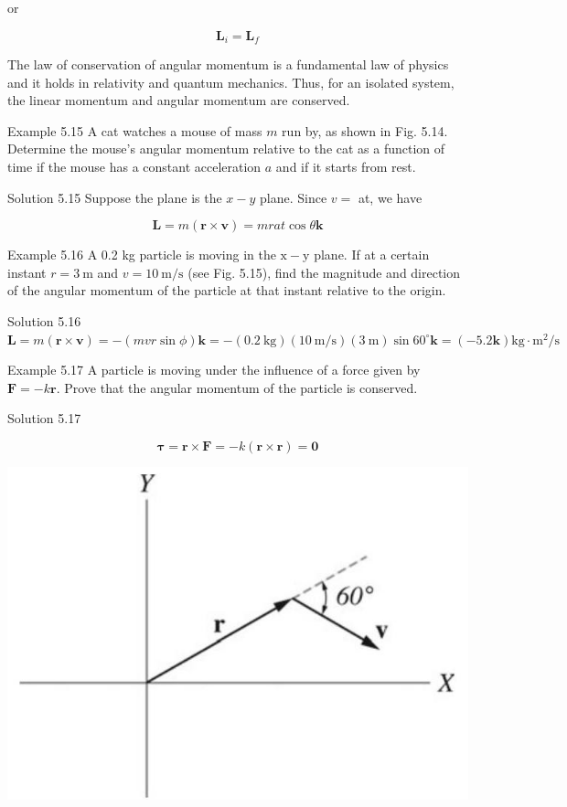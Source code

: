\documentclass[10pt]{article}
\begin{document}
or

$$
\mathbf{L}_{i}=\mathbf{L}_{f}
$$

The law of conservation of angular momentum is a fundamental law of physics and it holds in relativity and quantum mechanics. Thus, for an isolated system, the linear momentum and angular momentum are conserved.

Example 5.15 A cat watches a mouse of mass $m$ run by, as shown in Fig. 5.14. Determine the mouse's angular momentum relative to the cat as a function of time if the mouse has a constant acceleration $a$ and if it starts from rest.

Solution 5.15 Suppose the plane is the $x-y$ plane. Since $v=$ at, we have

$$
\mathbf{L}=m(\mathbf{r} \times \mathbf{v})=m r a t \cos \theta \mathbf{k}
$$

Example 5.16 A 0.2 kg particle is moving in the $\mathrm{x}-\mathrm{y}$ plane. If at a certain instant $r=3 \mathrm{~m}$ and $v=10 \mathrm{~m} / \mathrm{s}$ (see Fig. 5.15), find the magnitude and direction of the angular momentum of the particle at that instant relative to the origin.

Solution 5.16\\
$\mathbf{L}=m(\mathbf{r} \times \mathbf{v})=-(m v r \sin \phi) \mathbf{k}=-(0.2 \mathrm{~kg})(10 \mathrm{~m} / \mathrm{s})(3 \mathrm{~m}) \sin 60^{\circ} \mathbf{k}=(-5.2 \mathbf{k}) \mathrm{kg} \cdot \mathrm{m}^{2} / \mathrm{s}$

Example 5.17 A particle is moving under the influence of a force given by $\mathbf{F}=-k \mathbf{r}$. Prove that the angular momentum of the particle is conserved.

Solution 5.17

$$
\boldsymbol{\tau}=\mathbf{r} \times \mathbf{F}=-k(\mathbf{r} \times \mathbf{r})=\mathbf{0}
$$

\begin{center}
\includegraphics[max width=\textwidth]{2024_09_13_db1f357d2aad0a03eb2eg-092}
\end{center}
\end{document}
